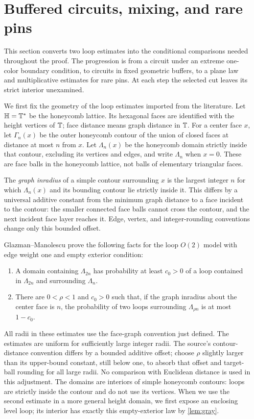 \section{Buffered circuits, mixing, and rare pins}\label{sec:cuts}

This section converts two loop estimates into the conditional comparisons
needed throughout the proof.  The progression is from a circuit under an
extreme one-color boundary condition, to circuits in fixed geometric
buffers, to a plane law and multiplicative estimates for rare pins.  At
each step the selected cut leaves its strict interior unexamined.

We first fix the geometry of the loop estimates imported from the literature.
Let $\mathbb H=\mathbb T^*$ be the honeycomb lattice.  Its hexagonal faces are
identified with the height vertices of $\mathbb T$; face distance means graph
distance in $\mathbb T$.  For a center face $x$, let $\Gamma_n(x)$ be the outer
honeycomb contour of the union of closed faces at distance at most $n$
from $x$.  Let $\Lambda_n(x)$ be the honeycomb domain strictly inside
that contour, excluding its vertices and edges, and write $\Lambda_n$
when $x=0$.  These are face balls in the honeycomb lattice, not balls of
elementary triangular faces.

The \emph{graph inradius} of a simple contour surrounding $x$ is the largest
integer $n$ for which $\Lambda_n(x)$ and its bounding contour lie strictly
inside it.  This differs by a universal additive constant from the minimum
graph distance to a face incident to the contour: the smaller connected
face balls cannot cross the contour, and the next incident face layer
reaches it.  Edge, vertex, and integer-rounding conventions change only
this bounded offset.

Glazman--Manolescu \cite[Theorem~1.2(iv), equations~(1.1)--(1.2)]{GM2021} prove the following facts
for the loop $O(2)$ model with edge weight one and empty exterior condition:
\begin{enumerate}[label=(\roman*)]
\item A domain containing $\Lambda_{2n}$ has probability at least $c_0>0$
of a loop contained in $\Lambda_{2n}$ and surrounding $\Lambda_n$.
\item There are $0<\rho<1$ and $c_0>0$ such that, if the graph inradius
about the center face is $n$, the probability of two loops surrounding
$\Lambda_{\rho n}$ is at most $1-c_0$.
\end{enumerate}
All radii in these estimates use the face-graph convention just defined.
The estimates are uniform for sufficiently large integer radii.  The
source's contour-distance convention differs by a bounded additive offset;
choose $\rho$ slightly larger than its upper-bound constant, still below
one, to absorb that offset and target-ball rounding for all large radii.
No comparison with Euclidean distance is used in this adjustment.  The
domains are interiors of simple honeycomb contours: loops are strictly inside
the contour and do not use its vertices.  When we use the second estimate
in a more general height domain, we first expose an enclosing level loop;
its interior has exactly this empty-exterior law by \cref{lem:gray}.


